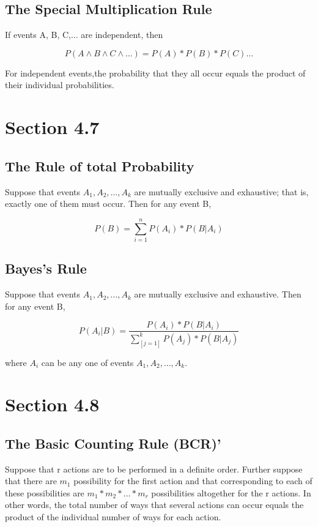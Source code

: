 \documentclass[12pt]{article}
\begin{document}
        \subsection*{The Special Multiplication Rule}
            If events A, B, C,$\dots$ are independent, then
            \begin{center}
                \[
                    P(A \wedge B \wedge C \wedge \dots) = P(A) * P(B) * P(C) \dots     
                \]
            \end{center}
            For independent events,the probability that they all occur equals the product of their 
            individual probabilities.

    \section*{Section 4.7}
        \subsection*{The Rule of total Probability}
        Suppose that events $A_1, A_2,\dots, A_k$ are mutually exclusive and exhaustive; that is, 
        exactly one of them must occur. Then for any event B,
        \begin{center}
            \[
                P(B) = \sum_{i=1}^n P(A_i) * P(B|A_i)
            \]
        \end{center}
        \subsection*{Bayes's Rule}
            Suppose that events $A_1, A_2,..., A_k$ are mutually exclusive and exhaustive. Then for 
            any event B,
            \begin{center}
                \[
                    P(A_i|B) = \frac{P(A_i) * P(B|A_i)}{\sum_[j=1]^k P(A_j) * P(B|A_j)}    
                \]
            \end{center}
            where $A_i$ can be any one of events $A_1, A_2,\dots, A_k$.
            
    \section*{Section 4.8}
        \subsection*{The Basic Counting Rule (BCR)'}
            Suppose that r actions are to be performed in a definite order. Further suppose that
            there are $m_1$ possibility for the first action and that corresponding to each of
            these possibilities are $m_1 * m_2 * \dots * m_r$ possibilities altogether for the r
            actions. In other words, the total
            number of ways that several actions can occur equals the product of the individual 
            number of ways for each action.
\end{document}
